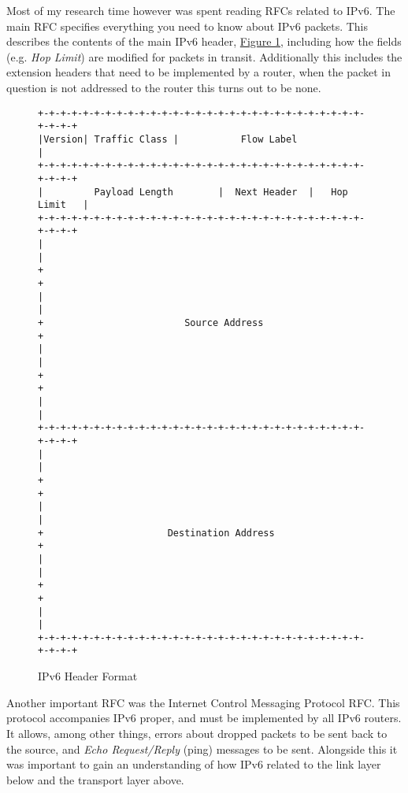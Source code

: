 \documentclass[12pt,a4paper,twoside,openright]{report}
\begin{document}
\bigskip

Most of my research time however was spent reading RFCs related to IPv6.  The main RFC\cite{ipv6_rfc} specifies everything you need to know about IPv6 packets. This describes the contents of the main IPv6 header, \hyperref[fig::ipv6_header]{Figure }\ref{fig::ipv6_header}, including how the fields (e.g. \textit{Hop Limit}) are modified for packets in transit. Additionally this includes the extension headers that need to be implemented by a router, when the packet in question is not addressed to the router this turns out to be none. 

\begin{figure}
\centering
\begin{varwidth}{\linewidth}
\begin{verbatim}
+-+-+-+-+-+-+-+-+-+-+-+-+-+-+-+-+-+-+-+-+-+-+-+-+-+-+-+-+-+-+-+-+
|Version| Traffic Class |           Flow Label                  |
+-+-+-+-+-+-+-+-+-+-+-+-+-+-+-+-+-+-+-+-+-+-+-+-+-+-+-+-+-+-+-+-+
|         Payload Length        |  Next Header  |   Hop Limit   |
+-+-+-+-+-+-+-+-+-+-+-+-+-+-+-+-+-+-+-+-+-+-+-+-+-+-+-+-+-+-+-+-+
|                                                               |
+                                                               +
|                                                               |
+                         Source Address                        +
|                                                               |
+                                                               +
|                                                               |
+-+-+-+-+-+-+-+-+-+-+-+-+-+-+-+-+-+-+-+-+-+-+-+-+-+-+-+-+-+-+-+-+
|                                                               |
+                                                               +
|                                                               |
+                      Destination Address                      +
|                                                               |
+                                                               +
|                                                               |
+-+-+-+-+-+-+-+-+-+-+-+-+-+-+-+-+-+-+-+-+-+-+-+-+-+-+-+-+-+-+-+-+
\end{verbatim}
\end{varwidth}
\caption{IPv6 Header Format\cite{ipv6_rfc}}
\label{fig::ipv6_header}
\end{figure}

\bigskip

Another important RFC was the Internet Control Messaging Protocol RFC\cite{icmpv6_rfc}.  This protocol accompanies IPv6 proper, and must be implemented by all IPv6 routers.  It allows, among other things, errors about dropped packets to be sent back to the source, and \textit{Echo Request/Reply} (ping) messages to be sent.  Alongside this it was important to gain an understanding of how IPv6 related to the link layer below and the transport layer above.
\end{document}
